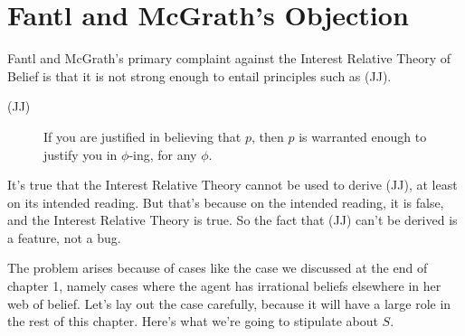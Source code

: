 \section{Fantl and McGrath's Objection}

Fantl and McGrath's primary complaint against the Interest Relative Theory of Belief is that it is not strong enough to entail principles such as (JJ).

\begin{description}
\item[(JJ)] If you are justified in believing that \(p\), then \(p\) is warranted enough to justify you in \(\phi\)-ing, for any \(\phi\). \cite[99]{FantlMcGrath2009}
\end{description}

\noindent It's true that the Interest Relative Theory cannot be used to derive (JJ), at least on its intended reading. But that's because on the intended reading, it is false, and the Interest Relative Theory is true. So the fact that (JJ) can't be derived is a feature, not a bug.

The problem arises because of cases like the case we discussed at the end of chapter 1, namely cases where the agent has irrational beliefs elsewhere in her web of belief. Let's lay out the case carefully, because it will have a large role in the rest of this chapter. Here's what we're going to stipulate about \(S\).

